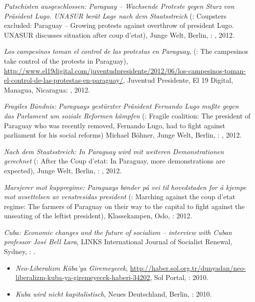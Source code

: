 \begin{itemize}
{\item \textit{Putschisten ausgeschlossen: Paraguay -- Wachsende Proteste gegen Sturz von Präsident Lugo. UNASUR berät Lage nach dem Staatsstreich} (\english: Coupsters excluded: Paraguay -- Growing protests against overthrow of president Lugo. UNASUR discusses situation after coup d'etat), Junge Welt, Berlin, \Germany: , 2012.
\item \textit{Los campesinos toman el control de las protestas en Paraguay}, (\english: The campesinos take control of the protests in Paraguay), \href{http://www.el19digital.com/juventudpresidente/2012/06/los-campesinos-toman-el-control-de-las-protestas-en-paraguay/}{http://www.el19digital.com/juventudpresidente/2012/06/los-campesinos-toman-el-control-de-las-protestas-en-paraguay/}, Juventud Presidente, El 19 Digital, Managua, Nicaragua: , 2012.
\item \textit{Fragiles Bündnis: Paraguays gestürzter Präsident Fernando Lugo mußte gegen das Parlament um soziale Reformen kämpfen} (\english: Fragile coalition: The president of Paraguay who was recently removed, Fernando Lugo, had to fight against parliament for his social reforms) \with Michael Böhner, Junge Welt, Berlin, \Germany: , 2012.
\item \textit{Nach dem Staatsstreich: In Paraguay wird mit weiteren Demonstrationen gerechnet} (\english: After the Coup d'etat: In Paraguay, more demonstrations are expected), Junge Welt, Berlin, \Germany: , 2012.
\item \textit{Marsjerer mot kuppregime: Paraguays bønder på vei til hovedstaden for å kjempe mot avsettelsen av venstresidas president} (\english: Marching against the coup d'etat regime: The farmers of Paraguay on their way to the capital to fight against the unseating of the leftist president), Klassekampen, Oslo, \Norway:  2012.
\item \textit{Cuba: Economic changes and the future of socialism -- interview with Cuban professor José Bell Lara}, LINKS International Journal of Socialist Renewal, Sydney, \Australia: .
    \begin{itemize}
    \item \translatedversion \turkish \textit{Neo-Liberalizm Küba’ya Giremeyecek}, \href{http://haber.sol.org.tr/dunyadan/neo-liberalizm-kuba-ya-giremeyecek-haberi-34202}{http://haber.sol.org.tr/dunyadan/neo-liberalizm-kuba-ya-giremeyecek-haberi-34202}, Sol Portal, \Turkey:  2010.
    \item \translatedversion \german \textit{Kuba wird nicht kapitalistisch}, Neues Deutschland, Berlin, \Germany:  2010.

\end{itemize}}
\end{itemize}
